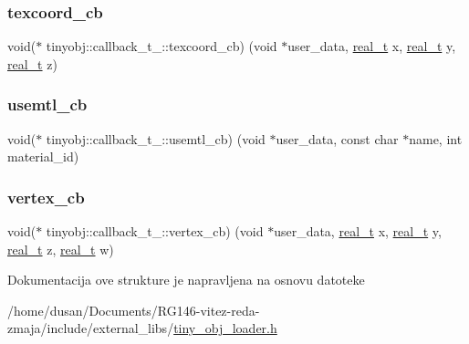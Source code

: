 \mbox{\label{structtinyobj_1_1callback__t___ac447bcedbbe734887d796b32604665e8}} 
\subsubsection{\texorpdfstring{texcoord\+\_\+cb}{texcoord\_cb}}
{\footnotesize\ttfamily void($\ast$ tinyobj\+::callback\+\_\+t\+\_\+\+::texcoord\+\_\+cb) (void $\ast$user\+\_\+data, \hyperlink{namespacetinyobj_ad5ca7469ff56bf0d8423120cfd99adce}{real\+\_\+t} x, \hyperlink{namespacetinyobj_ad5ca7469ff56bf0d8423120cfd99adce}{real\+\_\+t} y, \hyperlink{namespacetinyobj_ad5ca7469ff56bf0d8423120cfd99adce}{real\+\_\+t} z)}

\mbox{\label{structtinyobj_1_1callback__t___a8c5ae85ae10186b6c0e925b4b2b9a987}} 
\subsubsection{\texorpdfstring{usemtl\+\_\+cb}{usemtl\_cb}}
{\footnotesize\ttfamily void($\ast$ tinyobj\+::callback\+\_\+t\+\_\+\+::usemtl\+\_\+cb) (void $\ast$user\+\_\+data, const char $\ast$name, int material\+\_\+id)}

\mbox{\label{structtinyobj_1_1callback__t___a7029c16962a3edb4b036330f02f91816}} 
\subsubsection{\texorpdfstring{vertex\+\_\+cb}{vertex\_cb}}
{\footnotesize\ttfamily void($\ast$ tinyobj\+::callback\+\_\+t\+\_\+\+::vertex\+\_\+cb) (void $\ast$user\+\_\+data, \hyperlink{namespacetinyobj_ad5ca7469ff56bf0d8423120cfd99adce}{real\+\_\+t} x, \hyperlink{namespacetinyobj_ad5ca7469ff56bf0d8423120cfd99adce}{real\+\_\+t} y, \hyperlink{namespacetinyobj_ad5ca7469ff56bf0d8423120cfd99adce}{real\+\_\+t} z, \hyperlink{namespacetinyobj_ad5ca7469ff56bf0d8423120cfd99adce}{real\+\_\+t} w)}



Dokumentacija ove strukture je napravljena na osnovu datoteke \begin{DoxyCompactItemize}
\item 
/home/dusan/\+Documents/\+R\+G146-\/vitez-\/reda-\/zmaja/include/external\+\_\+libs/\hyperlink{tiny__obj__loader_8h}{tiny\+\_\+obj\+\_\+loader.\+h}\end{DoxyCompactItemize}
